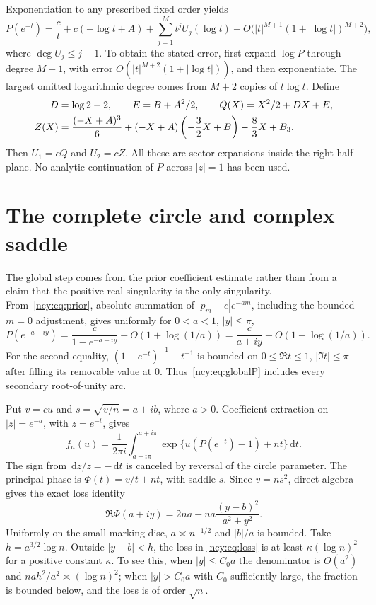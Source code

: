 \documentclass[11pt,letterpaper]{article}
\numberwithin{equation}{section}
\theoremstyle{remark}\newtheorem{remark}[theorem]{Remark}
\newcommand{\dd}{\,\mathrm d}
\theoremstyle{definition}\newtheorem{definition}[theorem]{Definition}\theoremstyle{plain}
\begin{document}
Exponentiation to any prescribed fixed order yields
\begin{equation}\label{ncy:eq:localP}
 P(e^{-t})=\frac ct+c(-\log t+A)
     +\sum_{j=1}^{M}t^jU_j(\log t)
     +O\bigl(|t|^{M+1}(1+|\log t|)^{M+2}\bigr),
\end{equation}
where $\deg U_j\leq j+1$. To obtain the stated error, first expand
$\log P$ through degree $M+1$, with error
$O(|t|^{M+2}(1+|\log t|))$, and then exponentiate. The largest omitted
logarithmic degree comes from $M+2$ copies of $t\log t$.
Define
\begin{align}\label{ncy:eq:QZ}
 D&=\log2-2,\qquad E=B+A^2/2,\qquad Q(X)=X^2/2+DX+E,\notag\\
 Z(X)&=\frac{(-X+A)^3}{6}+(-X+A)\left(-\frac32X+B\right)
                  -\frac83X+B_3.
\end{align}
Then $U_1=cQ$ and $U_2=cZ$. All these are sector expansions inside the
right half plane. No analytic continuation of $P$ across $|z|=1$ has
been used.

\section{The complete circle and complex saddle}\label{ncy:sec:circle}
The global step comes from the prior coefficient estimate rather than
from a claim that the positive real singularity is the only singularity.
From~\eqref{ncy:eq:prior}, absolute summation of
$|p_m-c|e^{-am}$, including the bounded $m=0$ adjustment, gives uniformly
for $0<a<1$, $|y|\leq\pi$,
\begin{equation}\label{ncy:eq:globalP}
 P(e^{-a-iy})=\frac{c}{1-e^{-a-iy}}+O(1+\log(1/a))
             =\frac{c}{a+iy}+O(1+\log(1/a)).
\end{equation}
For the second equality, $(1-e^{-t})^{-1}-t^{-1}$ is bounded on
$0\leq\Re t\leq1$, $|\Im t|\leq\pi$ after filling its removable
value at $0$. Thus~\eqref{ncy:eq:globalP} includes every secondary
root-of-unity arc.

Put $v=cu$ and $s=\sqrt{v/n}=a+ib$, where $a>0$. Coefficient extraction
on $|z|=e^{-a}$, with $z=e^{-t}$, gives
\begin{equation}\label{ncy:eq:cauchy}
 f_n(u)=\frac1{2\pi i}\int_{a-i\pi}^{a+i\pi}
        \exp\{u(P(e^{-t})-1)+nt\}\dd t.
\end{equation}
The sign from $\dd z/z=-\dd t$ is canceled by reversal of the circle
parameter. The principal phase is $\Phi(t)=v/t+nt$, with saddle $s$.
Since $v=ns^2$, direct algebra gives the exact loss identity
\begin{equation}\label{ncy:eq:loss}
 \Re\Phi(a+iy)=2na-na\frac{(y-b)^2}{a^2+y^2}.
\end{equation}
Uniformly on the small marking disc, $a\asymp n^{-1/2}$ and $|b|/a$
is bounded. Take $h=a^{3/2}\log n$. Outside $|y-b|<h$, the loss in
\eqref{ncy:eq:loss} is at least $\kappa(\log n)^2$ for a positive
constant $\kappa$. To see this, when $|y|\leq C_0a$ the denominator
is $O(a^2)$ and $na h^2/a^2\asymp(\log n)^2$; when
$|y|>C_0a$ with $C_0$ sufficiently large, the fraction is bounded
below, and the loss is of order $\sqrt n$.
\end{document}
